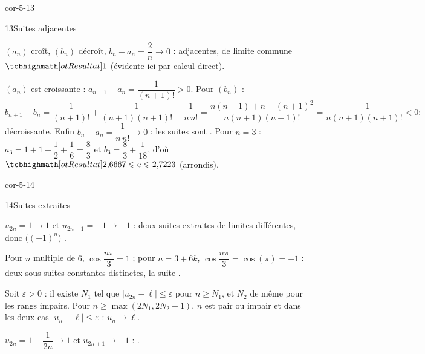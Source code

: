 \begin{blocLivre}{cor-5-13}
\begin{corrige}{13}{Suites adjacentes}
\begin{questions}
  \item $(a_n)$ croît, $(b_n)$ décroît, $b_n-a_n=\dfrac2n\to0$ : adjacentes,
    de limite commune $\res{1}$ (évidente ici par calcul direct).
  \item $(a_n)$ est croissante : $a_{n+1}-a_n=\dfrac{1}{(n+1)!}>0$. Pour
    $(b_n)$ :
    \[
      b_{n+1}-b_n=\frac{1}{(n+1)!}+\frac{1}{(n+1)(n+1)!}-\frac{1}{n\,n!}
      =\frac{n(n+1)+n-(n+1)^{2}}{n(n+1)(n+1)!}
      =\frac{-1}{n(n+1)(n+1)!}<0 :
    \]
    décroissante. Enfin $b_n-a_n=\dfrac{1}{n\,n!}\to0$ : les suites sont
    . Pour $n=3$ :
    $a_3=1+1+\dfrac12+\dfrac16=\dfrac{8}{3}$ et
    $b_3=\dfrac{8}{3}+\dfrac{1}{18}$, d'où
    $\res{2{,}6667\leq\mathrm{e}\leq2{,}7223}$ (arrondis).
\end{questions}
\end{corrige}
\end{blocLivre}

\begin{blocLivre}{cor-5-14}
\begin{corrige}{14}{Suites extraites}
\begin{questions}
  \item $u_{2n}=1\to1$ et $u_{2n+1}=-1\to-1$ : deux suites extraites de
    limites différentes, donc $\bigl((-1)^{n}\bigr)$ .
  \item Pour $n$ multiple de $6$, $\cos\dfrac{n\pi}{3}=1$ ; pour
    $n=3+6k$, $\cos\dfrac{n\pi}{3}=\cos(\pi)=-1$ : deux sous-suites
    constantes distinctes, la suite .
  \item Soit $\varepsilon>0$ : il existe $N_1$ tel que
    $|u_{2n}-\ell|\leq\varepsilon$ pour $n\geq N_1$, et $N_2$ de même pour
    les rangs impairs. Pour $n\geq\max(2N_1,2N_2+1)$, $n$ est pair ou
    impair et dans les deux cas $|u_n-\ell|\leq\varepsilon$ : $u_n\to\ell$.
  \item $u_{2n}=1+\dfrac{1}{2n}\to1$ et $u_{2n+1}\to-1$ :
    .
\end{questions}
\end{corrige}
\end{blocLivre}

